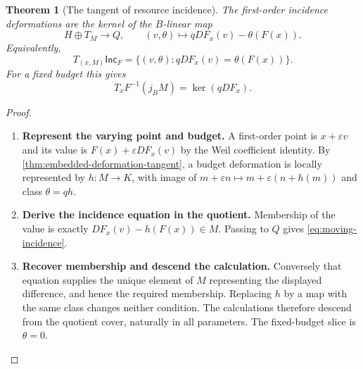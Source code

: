\documentclass[11pt,a4paper]{article}
\numberwithin{algorithm}{section}
\numberwithin{equation}{section}
\newtheorem{theorem}{Theorem}[section]
\theoremstyle{definition}
\theoremstyle{remark}
\theoremstyle{plain}
\newcommand{\eps}{\varepsilon}
\theoremstyle{definition}
\theoremstyle{plain}
\begin{document}
\begin{theorem}[The tangent of resource incidence]
\label{thm:moving-incidence}
The first-order incidence deformations are the kernel of the
$B$-linear map
\[
 H\oplus T_M\longrightarrow Q,
 \qquad(v,\theta)\longmapsto qDF_x(v)-\theta(F(x)).
\]
Equivalently,
\begin{equation}\label{eq:moving-incidence}
 T_{(x,M)}\mathsf{Inc}_F
 =\{(v,\theta):qDF_x(v)=\theta(F(x))\}.
\end{equation}
For a fixed budget this gives
\begin{equation}\label{eq:fixed-budget-tangent}
 T_xF^{-1}(j_BM)=\ker(qDF_x).
\end{equation}
\end{theorem}
\begin{proof}\leavevmode
\begin{enumerate}[leftmargin=*,align=left]
\item \textbf{Represent the varying point and budget.}
A first-order point is $x+\eps v$ and its value is
$F(x)+\eps DF_x(v)$ by the Weil coefficient identity.
By \cref{thm:embedded-deformation-tangent}, a budget deformation
is locally represented by $h:M\to K$, with image of
$m+\eps n\mapsto m+\eps(n+h(m))$ and class $\theta=qh$.

\item \textbf{Derive the incidence equation in the quotient.}
Membership of the value is exactly
$DF_x(v)-h(F(x))\in M$. Passing to $Q$ gives
\eqref{eq:moving-incidence}.

\item \textbf{Recover membership and descend the calculation.}
Conversely that equation supplies
the unique element of $M$ representing the displayed difference,
and hence the required membership. Replacing $h$ by a map with
the same class changes neither condition. The calculations
therefore descend from the quotient cover, naturally in all
parameters. The fixed-budget slice is $\theta=0$.
\end{enumerate}
\end{proof}
\end{document}
